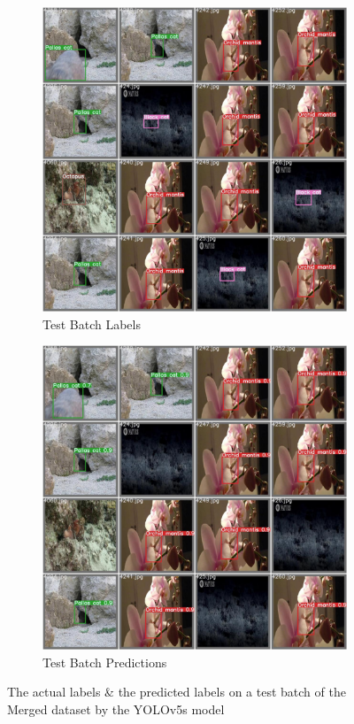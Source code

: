 \documentclass[conference]{IEEEtran}
\begin{document}
\begin{figure}[ht]
\centering
\begin{subfigure}{0.7\linewidth}
    \includegraphics[width=1\textwidth]{Experiments/Merged/test_batch2_labels.jpg}
    \caption{Test Batch Labels}
    \label{fig:merged_label}
\end{subfigure}
\hfill
\begin{subfigure}{0.7\linewidth}
    \includegraphics[width=1\textwidth]{Experiments/Merged/test_batch2_pred.jpg}
    \caption{Test Batch Predictions}
    \label{fig:merged_pred}
\end{subfigure}
\caption{The actual labels \& the predicted labels on a test batch of the Merged dataset by the YOLOv5s model}
\label{fig13}
\end{figure}
\end{document}

